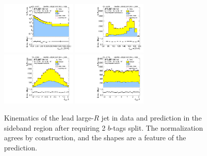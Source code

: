 \clearpage

\begin{figure}[htbp!]
\begin{center}
\includegraphics[width=0.32\textwidth,angle=-90]{figures/boosted/Sideband/b77_TwoTag_split_Sideband_leadHCand_Pt_m_1.pdf}
\includegraphics[width=0.32\textwidth,angle=-90]{figures/boosted/Sideband/b77_TwoTag_split_Sideband_leadHCand_Mass_s.pdf}\\
\includegraphics[width=0.32\textwidth,angle=-90]{figures/boosted/Sideband/b77_TwoTag_split_Sideband_leadHCand_Eta.pdf}
\includegraphics[width=0.32\textwidth,angle=-90]{figures/boosted/Sideband/b77_TwoTag_split_Sideband_leadHCand_Phi.pdf}
  \caption{Kinematics of the lead large-$R$ jet in data and prediction in the sideband region after requiring 2 $b$-tags split. The normalization agrees by construction, and the shapes are a feature of the prediction.}
  \label{fig:boosted-2bs-sideband-ak10-lead}
\end{center}
\end{figure}

